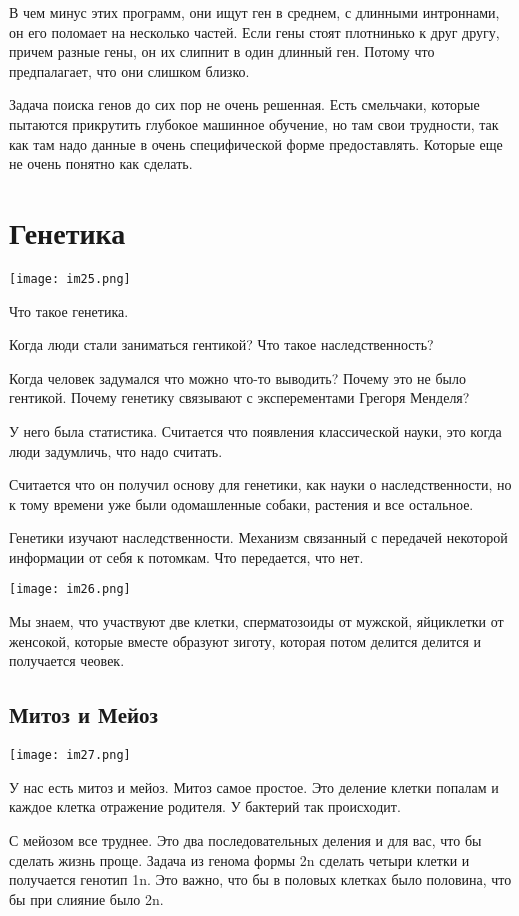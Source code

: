 В чем минус этих программ, они ищут ген в среднем, с длинными 
интроннами, он его поломает на несколько частей. Если гены 
стоят плотнинько к друг другу, причем разные гены, он 
их слипнит в один длинный ген. Потому что предпалагает, что они слишком близко. 

Задача поиска генов до сих пор не очень решенная. Есть смельчаки, 
которые пытаются прикрутить глубокое машинное обучение, но 
там свои трудности, так как там надо данные в очень специфической форме 
предоставлять. Которые еще не очень понятно как сделать. 

\section{Генетика}
\texttt{[image: im25.png]}

Что такое генетика. 

Когда люди стали заниматься гентикой? 
Что такое наследственность?

Когда человек задумался что можно что-то выводить? Почему 
это не было гентикой. Почему генетику связывают с эксперементами Грегоря Менделя? 

У него была статистика. Считается что появления классической науки, это
когда люди задумличь, что надо считать. 

Считается что он получил основу для генетики, как науки о наследственности, 
но к тому времени уже были одомашленные собаки, растения и все остальное. 

Генетики изучают наследственности. Механизм связанный с передачей некоторой информации
от себя к потомкам. Что передается, что нет.
 
\texttt{[image: im26.png]}

Мы знаем, что участвуют две клетки, сперматозоиды от мужской, 
яйциклетки от женсокой, которые вместе образуют зиготу, которая потом 
делится делится и получается чеовек. 


\subsection{Митоз и Мейоз}
\texttt{[image: im27.png]}

У нас есть митоз и мейоз. Митоз самое простое. Это 
деление клетки попалам и каждое клетка 
отражение родителя. У бактерий так происходит. 

С мейозом все труднее. Это два последовательных деления и для вас, 
что бы сделать жизнь проще. Задача из генома формы 2n 
сделать четыри клетки и получается генотип 1n. Это
важно, что бы в половых клетках было половина, что
бы при слияние было 2n.

